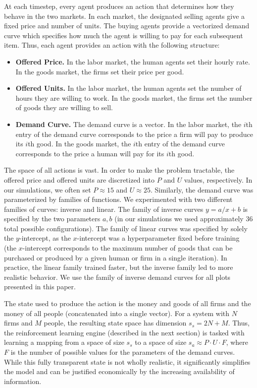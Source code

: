 \documentclass[twoside,twocolumn]{article}
\begin{document}
\medskip

At each timestep, every agent produces an action that determines how they behave in the two markets. In each market, the designated selling agents give a fixed price and number of units. The buying agents provide a vectorized demand curve which specifies how much the agent is willing to pay for each subsequent item. Thus, each agent provides an action with the following structure:
\begin{itemize}
  \item \textbf{Offered Price.} In the labor market, the human agents set their hourly rate. In the goods market, the firms set their price per good.
  \item \textbf{Offered Units.} In the labor market, the human agents set the number of hours they are willing to work. In the goods market, the firms set the number of goods they are willing to sell.
  \item \textbf{Demand Curve.} The demand curve is a vector. In the labor market, the $i$th entry of the demand curve corresponds to the price a firm will pay to produce its $i$th good. In the goods market, the $i$th entry of the demand curve corresponds to the price a human will pay for its $i$th good.
\end{itemize}

The space of all actions is vast. In order to make the problem tractable, the offered price and offered units are discretized into $P$ and $U$ values, respectively. In our simulations, we often set $P \approx 15$ and $U \approx 25$. Similarly, the demand curve was parameterized by families of functions. We experimented with two different families of curves: inverse and linear. The family of inverse curves $y = a/x + b$ is specified by the two parameters $a, b$ (in our simulations we used approximately 36 total possible configurations). The family of linear curves was specified by solely the $y$-intercept, as the $x$-intercept was a hyperparameter fixed before training (the $x$-intercept corresponds to the maximum number of goods that can be purchased or produced by a given human or firm in a single iteration). In practice, the linear family trained faster, but the inverse family led to more realistic behavior. We use the family of inverse demand curves for all plots presented in this paper.

\medskip

The state used to produce the action is the money and goods of all firms and the money of all people (concatenated into a single vector). For a system with $N$ firms and $M$ people, the resulting state space has dimension $s_s = 2N + M$. Thus, the reinforcement learning engine (described in the next section) is tasked with learning a mapping from a space of size $s_s$ to a space of size $s_a \approx P \cdot U \cdot F$, where $F$ is the number of possible values for the parameters of the demand curves. While this fully transparent state is not wholly realistic, it significantly simplifies the model and can be justified economically by the increasing availability of information.
\end{document}
